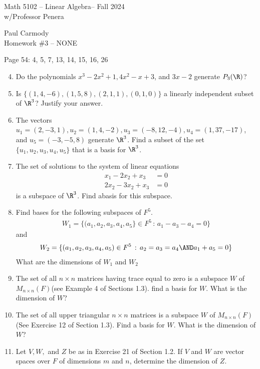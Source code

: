 \documentclass[10pt,a4paper]{report}
\newcommand{\CLASSNAME}{Math 5102 -- Linear Algebra}
\newcommand{\STUDENTNAME}{Paul Carmody}
\newcommand{\ASSIGNMENT}{Homework \#3 }
\newcommand{\DUEDATE}{NONE}
\newcommand{\SEMESTER}{Fall 2024}
\begin{document}
\begin{center}
	\Large{\CLASSNAME -- \SEMESTER} \\
	\large{ w/Professor Penera}
\end{center}
\begin{center}
	\STUDENTNAME \\
	\ASSIGNMENT -- \DUEDATE\\
\end{center} 
Page 54: 4, 5, 7, 13, 14, 15, 16, 26
\begin{enumerate}
	\setcounter{enumi}{3}
	\item Do the polynomials $x^3-2x^2+1, 4x^2-x+3$, and $3x-2$ generate $P_3(\R)$?
	\item Is $\{(1,4,-6),(1,5,8), (2,1,1), (0,1,0)\}$ a linearly independent subset of $\R^3$?  Justify your answer.
	\setcounter{enumi}{6}
	\item The vectors $u_1 = (2,-3,1), u_2=(1,4,-2), u_3=(-8,12,-4), u_4=(1,37,-17)$, and $u_5=(-3,-5,8)$ generate $\R^3$.  Find a subset of the set $\{u_1,u_2,u_3,u_4,u_5\}$ that is a basis for $\R^3$.
	\setcounter{enumi}{12}
	\item The set of solutions to the system of linear equations
	\begin{align*}
		x_1-2x_2+x_3&=0\\
		2x_2-3x_2+x_3&=0
	\end{align*}is a subspace of $\R^3$.  Find abasis for this subspace.
	\item Find bases for the following subspaces of $F^5$.
	\begin{align*}
		W_1 = \{(a_1,a_2,a_3,a_4,a_5\} \in F^5\,:\, a_1-a_3-a_4=0\}
	\end{align*} and
	\begin{align*}
		W_2=\{(a_1,a_2,a_3,a_4,a_5)\in F^5\,:\, a_2=a_3=a_4\AND a_1+a_5=0\}
	\end{align*}What are the dimensions of $W_1$ and $W_2$
	\item The set of all $n\times n$ matrices having trace equal to zero is a subspace $W$ of $M_{n\times n}(F)$(see Example 4 of Sections 1.3).  find a basis for $W$.  What is the dimension of $W$?
	\item The set of all upper triangular $n\times n$ matrices is a subspace $W$ of $M_{n\times n}(F)$(See Exercise 12 of Section 1.3).  Find a basis for $W$.  What is the dimension of $W$?
	\setcounter{enumi}{25}
	\item Let $V, W,$ and $Z$ be as in Exercise 21 of Section 1.2.  If $V$ and $W$ are vector spaces over $F$ of dimensions $m$ and $n$, determine the dimension of $Z$.
\end{enumerate}
\end{document}
